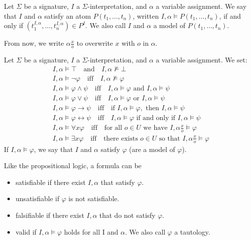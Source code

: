 \documentclass[10pt, letterpaper]{report}
\begin{document}
\begin{definition}
Let $\Sigma$ be a signature, $I$ a $\Sigma$-interpretation, and $\alpha$ a variable assignment. We say that $I$ and $\alpha$ satisfy an atom $P(t_1, \dots, t_n)$, written $I, \alpha \models P(t_1, \dots, t_n)$, if and only if $(t_1^{I,\alpha}, \dots, t_n^{I,\alpha}) \in P^I$. We also call $I$ and $\alpha$ a model of $P(t_1, \dots, t_n)$.
\end{definition}
From now, we write $\alpha\frac{x}{o}$ to overwrite $x$ with $o$ in $\alpha$.
\begin{definition}
Let $\Sigma$ be a signature, $I$ a $\Sigma$-interpretation, and $\alpha$ a variable assignment. We set:
\begin{align*}
    &I, \alpha \models \top \quad \text{and} \quad I, \alpha \not\models \bot \\
    &I, \alpha \models \neg \varphi \quad \text{iff} \quad I, \alpha \not\models \varphi \\
    &I, \alpha \models \varphi \wedge \psi \quad \text{iff} \quad I, \alpha \models \varphi \text{ and } I, \alpha \models \psi \\
    &I, \alpha \models \varphi \vee \psi \quad \text{iff} \quad I, \alpha \models \varphi \text{ or } I, \alpha \models \psi \\
    &I, \alpha \models \varphi \rightarrow \psi \quad \text{iff} \quad \text{if } I, \alpha \models \varphi, \text{ then } I, \alpha \models \psi \\
    &I, \alpha \models \varphi \leftrightarrow \psi \quad \text{iff} \quad I, \alpha \models \varphi \text{ if and only if } I, \alpha \models \psi \\
    &I, \alpha \models \forall x \varphi \quad \text{iff} \quad \text{for all } o \in U \text{ we have } I, \alpha \frac{x}{o} \models \varphi \\
    &I, \alpha \models \exists x \varphi \quad \text{iff} \quad \text{there exists } o \in U \text{ so that } I, \alpha \frac{x}{o} \models \varphi
\end{align*}
If $I, \alpha \models \varphi$, we say that $I$ and $\alpha$ satisfy $\varphi$ (are a model of $\varphi$).
\end{definition}
Like the propositional logic, a formula can be\begin{itemize}
    \item  satisfiable if there exist $I,\alpha$ that satisfy $\varphi$.
    \item unsatisfiable if $\varphi$ is not satisfiable.
    \item falsifiable if there exist $I,\alpha$ that do not satisfy $\varphi$.
    \item valid if $I,\alpha\models\varphi$ holds for all I and $\alpha$. We also call $\varphi$ a tautology.
\end{itemize}
\end{document}
